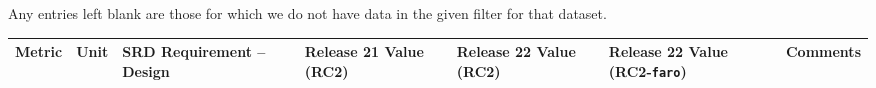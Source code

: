 \documentclass[DM, lsstdraft, toc]{lsstdoc}
\begin{document}
Any entries left blank are those for which we do not have data in the given filter for that dataset.

\begin{longtable}[]{@{}lllllll@{}}
\toprule
\begin{minipage}[b]{0.12\columnwidth}\raggedright\strut
Metric\strut
\end{minipage} & \begin{minipage}[b]{0.06\columnwidth}\raggedright\strut
Unit\strut
\end{minipage} & \begin{minipage}[b]{0.14\columnwidth}\raggedright\strut
SRD Requirement -- Design\strut
\end{minipage} & \begin{minipage}[b]{0.12\columnwidth}\raggedright\strut
Release 21 Value (RC2) \strut
\end{minipage} & \begin{minipage}[b]{0.12\columnwidth}\raggedright\strut
Release 22 Value (RC2) \strut
\end{minipage} & \begin{minipage}[b]{0.12\columnwidth}\raggedright\strut
Release 22 Value (RC2-\texttt{faro}) \strut
\end{minipage} & \begin{minipage}[b]{0.17\columnwidth}\raggedright\strut
Comments\strut
\end{minipage}\tabularnewline
\midrule
\endhead

\end{longtable}
\end{document}

